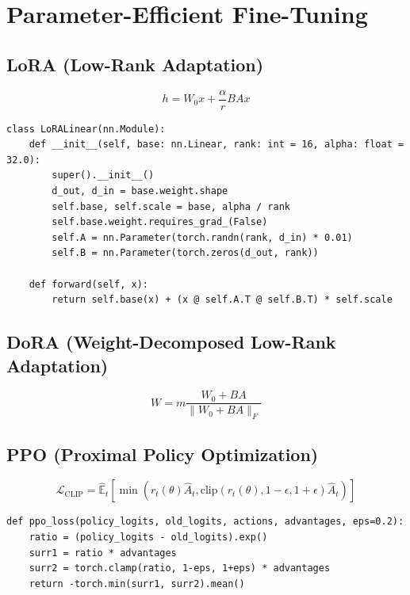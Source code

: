 \section{Parameter-Efficient Fine-Tuning}
\label{app:peft}

\subsection{LoRA (Low-Rank Adaptation)}
\label{form:lora}

\[
  h = W_0 x + \frac{\alpha}{r} B A x
\]

\begin{lstlisting}[style=pythonstyle, caption={LoRA linear layer}, label=lst:lora]
class LoRALinear(nn.Module):
    def __init__(self, base: nn.Linear, rank: int = 16, alpha: float = 32.0):
        super().__init__()
        d_out, d_in = base.weight.shape
        self.base, self.scale = base, alpha / rank
        self.base.weight.requires_grad_(False)
        self.A = nn.Parameter(torch.randn(rank, d_in) * 0.01)
        self.B = nn.Parameter(torch.zeros(d_out, rank))

    def forward(self, x):
        return self.base(x) + (x @ self.A.T @ self.B.T) * self.scale
\end{lstlisting}

\subsection{DoRA (Weight-Decomposed Low-Rank Adaptation)}
\label{form:dora}

\[
  W = m \frac{W_0 + BA}{\|W_0 + BA\|_F}
\]

\subsection{PPO (Proximal Policy Optimization)}
\label{form:ppo}

\[
  \mathcal{L}_\mathrm{CLIP} = \hat{\mathbb{E}}_t [ \min(r_t(\theta) \hat{A}_t, \text{clip}(r_t(\theta), 1-\epsilon, 1+\epsilon) \hat{A}_t) ]
\]

\begin{lstlisting}[style=pythonstyle, caption={PPO clipped objective}, label=lst:ppo]
def ppo_loss(policy_logits, old_logits, actions, advantages, eps=0.2):
    ratio = (policy_logits - old_logits).exp()
    surr1 = ratio * advantages
    surr2 = torch.clamp(ratio, 1-eps, 1+eps) * advantages
    return -torch.min(surr1, surr2).mean()
\end{lstlisting}

